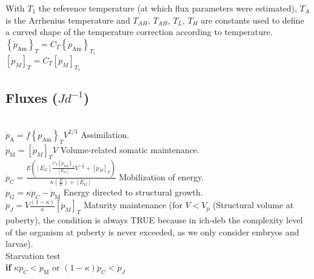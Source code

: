 With $T_{1}$ the reference temperature (at which flux parameters were estimated), $T_{A}$ is the Arrhenius temperature and $T_{AH}$, $T_{AH}$, $T_{L}$, $T_{H}$ are constants used to define a curved shape of the temperature correction according to temperature.\\

$\left \{ \dot{p}_\mathrm{Am} \right \}_{T} = C_{T} \left \{ \dot{p}_\mathrm{Am} \right \}_{T_{1}}$\\

$\left [ \dot{p}_{M} \right ]_{T} = C_{T} \left [ \dot{p}_{M} \right ]_{T_{1}}$\\

\subsection*{Fluxes ($Jd^{-1}$)}
\hfill \\

$\dot{p}_\mathrm{A} = f \left \{ \dot{p}_\mathrm{Am} \right \}_{T} V^{2/3}$ \hfill Assimilation.\\

$\dot{p}_\mathrm{M} = \left [ \dot{p}_{M} \right ]_{T} V$ \hfill Volume-related somatic maintenance.\\


	$\dot{p}_{C} = \frac
					   {E\left ( \left [ E_{G} \right ] \frac{C_{T}\left \{ \dot{p}_\mathrm{Am} \right \}_{T}}{\left [ E_{m} \right ]} V^{-\frac{1}{3}}+\left [ \dot{p}_{M} \right ]_{T}\right )}
					   {\kappa\left ( \frac{E}{V} \right ) + \left [ E_{G} \right ]}$ \hfill Mobilization of energy.\\

$\dot{p}_{G} = \kappa \dot{p}_{C} - \dot{p}_\mathrm{M}$ \hfill Energy directed to structural growth.\\

$\dot{p}_{J} = V \frac{\left ( 1 - \kappa \right )}{\kappa}\left [ \dot{p}_{M} \right ]_{T}$ \hfill Maturity maintenance (for $V < V_{p}$ (Structural volume at puberty), the condition is always TRUE because in \gls{ich-deb} the complexity level of the organism at puberty is never exceeded, as we only consider embryos and larvae).\\

Starvation test\\

\textbf{if} $\kappa \dot{p}_{C} < \dot{p}_\mathrm{M}$ or $\left ( 1- \kappa \right ) \dot{p}_{C} < \dot{p}_{J}$\\

